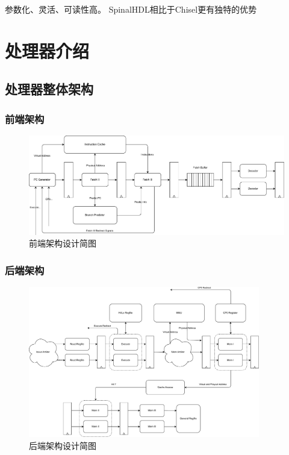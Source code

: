 \documentclass{beamer}
\begin{document}
\begin{frame}
    \begin{block}{参数化、灵活、可读性高。}
        SpinalHDL相比于Chisel更有独特的优势
    \end{block}

\end{frame}

\section{处理器介绍}

\subsection{处理器整体架构}

\begin{frame}
    \frametitle{前端架构}

    \begin{figure}
        \centering
        \includegraphics[width=\textwidth]{pic/front-end.pdf}
        \caption{前端架构设计简图}
    \end{figure}
\end{frame}

\begin{frame}
    \frametitle{后端架构}
    \begin{figure}
        \centering
        \includegraphics[width=0.9\textwidth]{pic/back-end.pdf}
        \caption{后端架构设计简图}
    \end{figure}
\end{frame}
\end{document}
